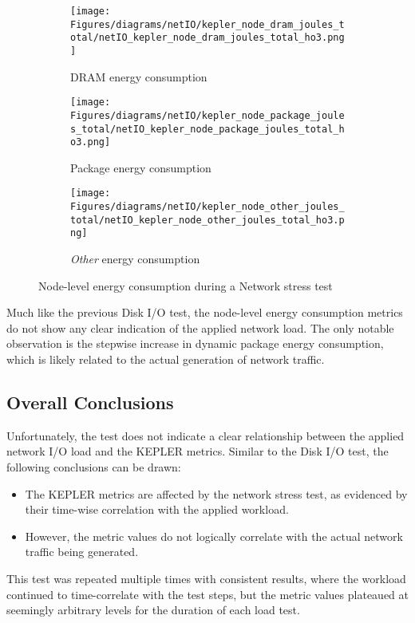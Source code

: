 \begin{figure}[H]
    \centering
    \begin{subfigure}{0.49\textwidth}
        \texttt{[image: Figures/diagrams/netIO/kepler\_node\_dram\_joules\_total/netIO\_kepler\_node\_dram\_joules\_total\_ho3.png]}
        \caption{DRAM energy consumption}
        \label{fig:netIO_kepler_node_dram_joules_total}
    \end{subfigure}
    \begin{subfigure}{0.49\textwidth}
        \texttt{[image: Figures/diagrams/netIO/kepler\_node\_package\_joules\_total/netIO\_kepler\_node\_package\_joules\_total\_ho3.png]}
        \caption{Package energy consumption}
        \label{fig:netIO_kepler_node_package_joules_total}
    \end{subfigure}
    \begin{subfigure}{0.49\textwidth}
        \texttt{[image: Figures/diagrams/netIO/kepler\_node\_other\_joules\_total/netIO\_kepler\_node\_other\_joules\_total\_ho3.png]}
        \caption{\textit{Other} energy consumption}
        \label{fig:netIO_kepler_node_other_joules_total}
    \end{subfigure}
    \caption{Node-level energy consumption during a Network stress test}
\end{figure}

Much like the previous Disk I/O test, the node-level energy consumption metrics do not show any clear indication of the applied network load. The only notable observation is the stepwise increase in dynamic package energy consumption, which is likely related to the actual generation of network traffic.

\subsection{Overall Conclusions}

Unfortunately, the test does not indicate a clear relationship between the applied network I/O load and the KEPLER metrics. Similar to the Disk I/O test, the following conclusions can be drawn:
\begin{itemize}
    \item The KEPLER metrics are affected by the network stress test, as evidenced by their time-wise correlation with the applied workload.
    \item However, the metric values do not logically correlate with the actual network traffic being generated.
\end{itemize}

This test was repeated multiple times with consistent results, where the workload continued to time-correlate with the test steps, but the metric values plateaued at seemingly arbitrary levels for the duration of each load test.
